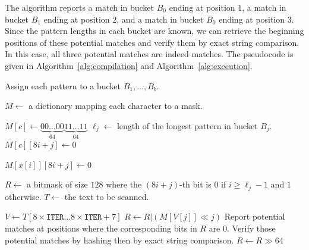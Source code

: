 The algorithm reports a match in bucket $B_0$ ending at position $1$, a match in bucket $B_1$ ending at position $2$, and a match in bucket $B_0$ ending at position $3$. Since the pattern lengths in each bucket are known, we can retrieve the beginning positions of these potential matches and verify them by exact string comparison. In this case, all three potential matches are indeed matches. The pseudocode is given in Algorithm~\ref{alg:compilation} and Algorithm~\ref{alg:execution}.

\begin{algorithm}[H]
  \caption{Compilation phase: building masks}
  \label{alg:compilation}
  \begin{algorithmic}[1]
    \State Assign each pattern to a bucket $B_1,\ldots,B_b$.

    \State $M\gets$  a dictionary mapping each character to a mask.

    \State $M[c] \gets \underbrace{00\ldots00}_{64}\underbrace{11\ldots11}_{64}$ 
    \State $\ell_j\gets$ length of the longest pattern in bucket $B_j$.
    \State $M[c][8i+j] \gets 0$ 
    \EndFor
    \EndFor
    \EndFor

    \State $M[x[i]][8i+j] \gets 0$
    \EndFor
    \EndFor
    \EndFor
  \end{algorithmic}
\end{algorithm}

\begin{algorithm}[H]
  \caption{Execution phase: scanning the text}
  \label{alg:execution}
  \begin{algorithmic}[1]
    \State $R\gets$ a bitmask of size $128$ where the $(8i+j)$-th bit is $0$ if $i\ge \ell_j-1$ and $1$ otherwise.
    \State $T\gets$ the text to be scanned.

    \State $V\gets T[8\times\texttt{ITER}\ldots 8\times\texttt{ITER}+7]$
    \State $R\gets R | (M[V[j]] \ll j)$
    \EndFor
    \State Report potential matches at positions where the corresponding bits in $R$ are $0$. Verify those potential matches by hashing then by exact string comparison.
    \State $R\gets R \gg 64$
    \EndFor
  \end{algorithmic}
\end{algorithm}

